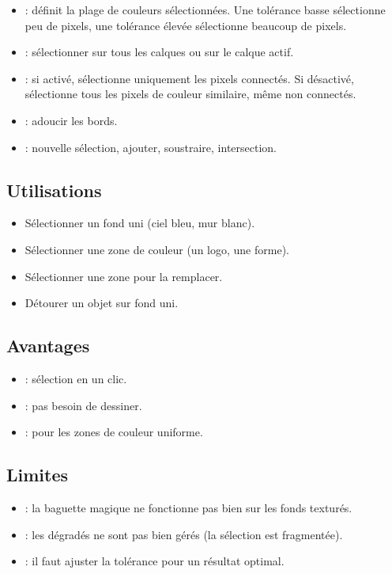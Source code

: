 \begin{itemize}
    \item {} : définit la plage de couleurs sélectionnées. Une tolérance basse sélectionne peu de pixels, une tolérance élevée sélectionne beaucoup de pixels.
    \item {} : sélectionner sur tous les calques ou sur le calque actif.
    \item {} : si activé, sélectionne uniquement les pixels connectés. Si désactivé, sélectionne tous les pixels de couleur similaire, même non connectés.
    \item {} : adoucir les bords.
    \item {} : nouvelle sélection, ajouter, soustraire, intersection.
\end{itemize}

\subsection{Utilisations}

\begin{itemize}
    \item Sélectionner un fond uni (ciel bleu, mur blanc).
    \item Sélectionner une zone de couleur (un logo, une forme).
    \item Sélectionner une zone pour la remplacer.
    \item Détourer un objet sur fond uni.
\end{itemize}

\subsection{Avantages}

\begin{itemize}
    \item {} : sélection en un clic.
    \item {} : pas besoin de dessiner.
    \item {} : pour les zones de couleur uniforme.
\end{itemize}

\subsection{Limites}

\begin{itemize}
    \item {} : la baguette magique ne fonctionne pas bien sur les fonds texturés.
    \item {} : les dégradés ne sont pas bien gérés (la sélection est fragmentée).
    \item {} : il faut ajuster la tolérance pour un résultat optimal.
\end{itemize}

